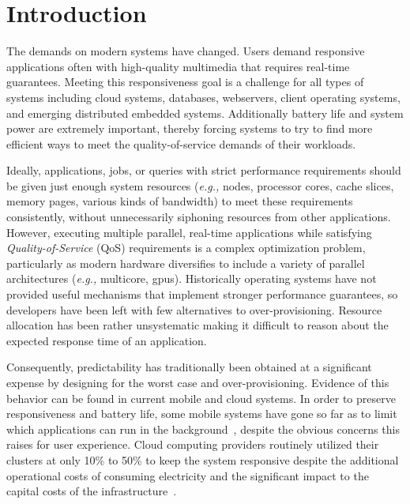 \section{Introduction}


The demands on modern systems have changed.  Users demand responsive applications often with high-quality multimedia that requires real-time guarantees.  Meeting this responsiveness goal is a challenge for all types of systems including cloud systems, databases, webservers, client operating systems, and emerging distributed embedded systems. Additionally battery life and system power are extremely important, thereby forcing systems to try to find more efficient ways to meet the quality-of-service demands of their workloads.

Ideally, applications, jobs, or queries with strict performance requirements should be given just enough system resources (\emph{e.g.,} nodes, processor cores, cache slices, memory pages, various kinds of bandwidth) to meet these requirements consistently, without unnecessarily siphoning resources from other applications. However, executing multiple parallel, real-time applications while satisfying  \emph{Quality-of-Service} (QoS) requirements is a complex optimization problem, particularly as modern hardware diversifies to include a variety of parallel architectures (\emph{e.g.,} multicore, gpus).  Historically operating systems have not provided useful mechanisms that implement stronger performance guarantees, so developers have been left with few alternatives to over-provisioning.  Resource allocation has been rather unsystematic making it difficult to reason about the expected response time of an application.

Consequently, predictability has traditionally been obtained at a significant expense by designing for the worst case and over-provisioning.  Evidence of this behavior can be found in current mobile and cloud systems.  In order to preserve responsiveness and battery life,  some mobile systems have gone so far as to limit which applications can run in the background~\cite{iOsDev}, despite the obvious concerns this raises for user experience.  Cloud computing providers routinely utilized their clusters at only 10\% to 50\% to keep the system responsive despite the additional operational costs of consuming electricity and the significant impact to the capital costs of the infrastructure~\cite{Barroso2009,Hennessy2011}. 


